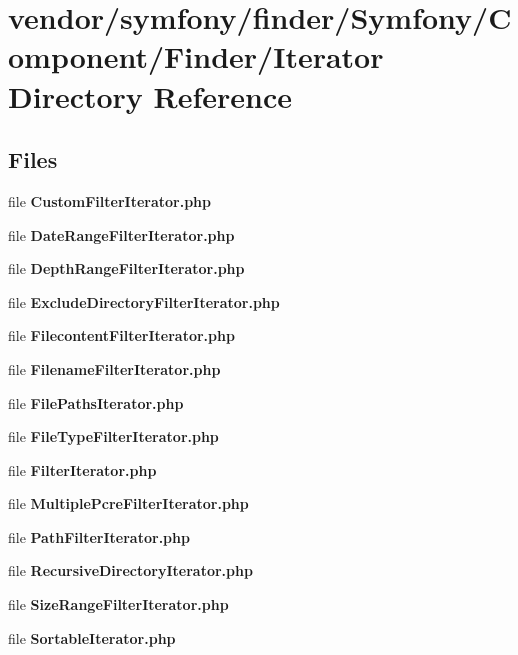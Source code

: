 \section{vendor/symfony/finder/\+Symfony/\+Component/\+Finder/\+Iterator Directory Reference}
\label{dir_e5f1bf920fa5652ef88476796495101a}
\subsection*{Files}
\begin{DoxyCompactItemize}
\item 
file {\bf Custom\+Filter\+Iterator.\+php}
\item 
file {\bf Date\+Range\+Filter\+Iterator.\+php}
\item 
file {\bf Depth\+Range\+Filter\+Iterator.\+php}
\item 
file {\bf Exclude\+Directory\+Filter\+Iterator.\+php}
\item 
file {\bf Filecontent\+Filter\+Iterator.\+php}
\item 
file {\bf Filename\+Filter\+Iterator.\+php}
\item 
file {\bf File\+Paths\+Iterator.\+php}
\item 
file {\bf File\+Type\+Filter\+Iterator.\+php}
\item 
file {\bf Filter\+Iterator.\+php}
\item 
file {\bf Multiple\+Pcre\+Filter\+Iterator.\+php}
\item 
file {\bf Path\+Filter\+Iterator.\+php}
\item 
file {\bf Recursive\+Directory\+Iterator.\+php}
\item 
file {\bf Size\+Range\+Filter\+Iterator.\+php}
\item 
file {\bf Sortable\+Iterator.\+php}
\end{DoxyCompactItemize}
